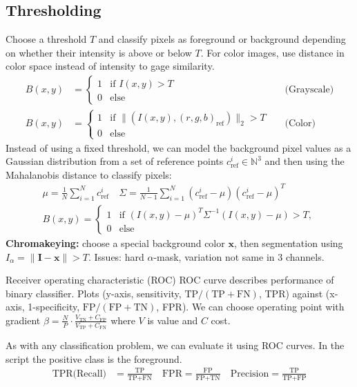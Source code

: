 \documentclass[a4paper,9pt]{article}
\begin{document}
\subsection{Thresholding}
Choose a threshold $T$ and classify pixels as foreground or background depending on whether their intensity is above or below $T$. For color images, use distance in color space instead of intensity to gage similarity.
\begin{align*}
  B(x,y) &= \begin{cases} 1 & \text{if } I(x,y) > T \\ 0 & \text{else} \end{cases} &&\text{(Grayscale)}\\
  B(x,y) &= \begin{cases} 1 & \text{if } \|(I(x,y), (r,g,b)_{\text{ref}})\|_2 > T \\ 0 & \text{else} \end{cases} &&\text{(Color)}
\end{align*}
Instead of using a fixed threshold, we can model the background pixel values as a Gaussian distribution from a set of reference points
$c_\text{ref}^i\in \mathbb{N}^3$ and then using the Mahalanobis distance to classify pixels:
\begin{align*}
  \mu = \frac{1}{N}\sum_{i=1}^{N} c_\text{ref}^{i}\quad
\Sigma = \frac{1}{N-1}\sum_{i=1}^{N} (c_\text{ref}^{i} - \mu)(c_\text{ref}^{i} - \mu)^{T}\\
B(x,y) = \begin{cases} 1 & \text{if } (I(x,y) - \mu)^{T}\Sigma^{-1}(I(x,y) - \mu) > T, \\ 0 & \text{else} \end{cases}
\end{align*}
\textbf{Chromakeying:} choose a special background color $\mathbf{x}$, then segmentation using $I_\alpha = \lVert\mathbf{I} - \mathbf{x}\rVert > T$. Issues: hard $\alpha$-mask, variation not same in 3 channels.
\begin{subbox}{Receiver operating characteristic (ROC)}
ROC curve describes performance of binary classifier. Plots (y-axis, sensitivity, $\text{TP}/(\text{TP}+\text{FN})$, TPR) against (x-axis, 1-specificity, $\text{FP}/(\text{FP}+\text{TN})$, FPR). We can choose operating point with gradient $\beta = \frac{N}{P} \cdot \frac{V_{\text{TN}} + C_{\text{FP}}}{V_{\text{TP}} + C_{\text{FN}}}$ where $V$ is value and $C$ cost.
\end{subbox}
As with any classification problem, we can evaluate it using ROC curves. In the script the positive class is the foreground.
\begin{align*}
\text{TPR(Recall)} &= \frac{\text{TP}}{\text{TP} + \text{FN}}\quad 
\text{FPR} = \frac{\text{FP}}{\text{FP} + \text{TN}} \quad
\text{Precision} = \frac{\text{TP}}{\text{TP} + \text{FP}}\\
\end{align*}
\end{document}
